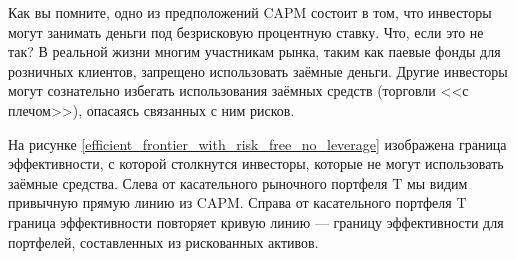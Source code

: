 Как вы помните, одно из предположений CAPM состоит в том, что инвесторы могут 
занимать деньги под безрисковую процентную ставку. Что, если это не так? В 
реальной жизни многим участникам рынка, таким как паевые фонды для розничных 
клиентов, запрещено использовать заёмные деньги. Другие инвесторы могут 
сознательно избегать использования заёмных средств (торговли <<с плечом>>), 
опасаясь связанных с ним рисков.

На рисунке \ref{efficient_frontier_with_risk_free_no_leverage} изображена 
граница эффективности, с которой столкнутся инвесторы, которые не могут 
использовать заёмные средства. Слева от касательного рыночного портфеля T мы
видим привычную прямую линию из CAPM. Справа от касательного портфеля T граница
эффективности повторяет кривую линию --- границу эффективности для портфелей, 
составленных из рискованных активов.

